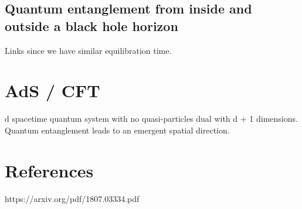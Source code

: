 \documentclass[11pt, oneside]{article}   	%
\theoremstyle{slanted}
\begin{document}
\subsection{Quantum entanglement from inside and outside a black hole horizon}
Links since we have similar equilibration time. 

\section{AdS / CFT} 
d spacetime quantum system with no quasi-particles dual
with d + 1 dimensions. 
Quantum entanglement leads to an emergent spatial direction.

\section{References} 
https://arxiv.org/pdf/1807.03334.pdf
\end{document}
